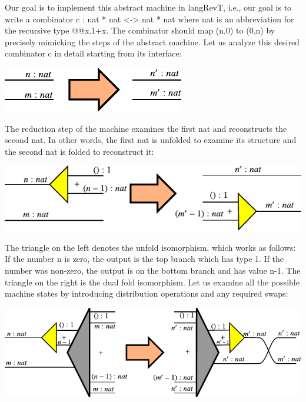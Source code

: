 \documentclass{llncs}
\begin{document}
Our goal is to implement this abstract machine in {{langRevT}}, i.e., our
goal is to write a combinator {{c : nat * nat <-> nat * nat}} where {{nat}}
is an abbreviation for the recursive type {{@@x.1+x}}. The combinator should
map {{(n,0)}} to {{(0,n)}} by precisely mimicking the steps of the abstract
machine. Let us analyze this desired combinator {{c}} in detail starting from
its interface:

\begin{center}
  \includegraphics{diagrams/nat-nat1.pdf}
\end{center}

The reduction step of the machine examines the first {{nat}} and reconstructs
the second {{nat}}. In other words, the first {{nat}} is unfolded to examine
its structure and the second {{nat}} is folded to reconstruct it:

\begin{center}
  \includegraphics{diagrams/nat-nat3.pdf}
\end{center}

The triangle on the left denotes the {{unfold}} isomorphism, which
works as follows: If the number {{n}} is zero, the output is the top
branch which has type {{1}}. If the number was non-zero, the output is
on the bottom branch and has value {{n-1}}. The triangle on the right
is the dual {{fold}} isomorphism.  Let us examine all the possible
machine states by introducing distribution operations and any required
swaps:


\begin{center}
  \includegraphics{diagrams/nat-nat4.pdf}
\end{center}
\end{document}
